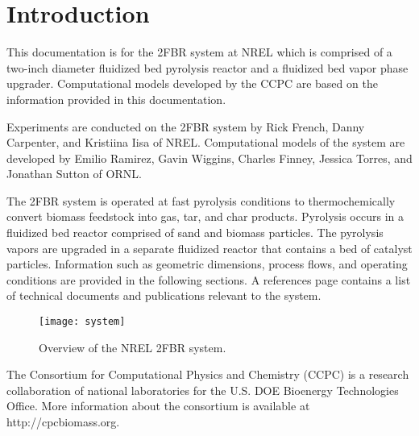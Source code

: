 
\section{Introduction}

This documentation is for the 2FBR system at NREL which is comprised of a two-inch diameter fluidized bed pyrolysis reactor and a fluidized bed vapor phase upgrader. Computational models developed by the CCPC are based on the information provided in this documentation.

Experiments are conducted on the 2FBR system by Rick French, Danny Carpenter, and Kristiina Iisa of NREL. Computational models of the system are developed by Emilio Ramirez, Gavin Wiggins, Charles Finney, Jessica Torres, and Jonathan Sutton of ORNL.

The 2FBR system is operated at fast pyrolysis conditions to thermochemically convert biomass feedstock into gas, tar, and char products. Pyrolysis occurs in a fluidized bed reactor comprised of sand and biomass particles. The pyrolysis vapors are upgraded in a separate fluidized reactor that contains a bed of catalyst particles. Information such as geometric dimensions, process flows, and operating conditions are provided in the following sections. A references page contains a list of technical documents and publications relevant to the system.

\begin{figure}[H]
    \centering
    \texttt{[image: system]}
    \caption{Overview of the NREL 2FBR system.}
    \label{fig:2fbr-system}
\end{figure}

The Consortium for Computational Physics and Chemistry (CCPC) is a research collaboration of national laboratories for the U.S. DOE Bioenergy Technologies Office. More information about the consortium is available at http://cpcbiomass.org.
